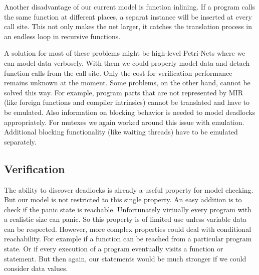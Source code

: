 Another disadvantage of our current model is function inlining.
If a program calls the same function at different places, a separat instance will be inserted at every call site.
This not only makes the net larger, it catches the translation process in an endless loop in recursive functions.

A solution for most of these problems might be high-level Petri-Nets where we can model data verbosely.
With them we could properly model data and detach function calls from the call site.
Only the cost for verification performance remains unknown at the moment.
Some problems, on the other hand, cannot be solved this way.
For example, program parts that are not represented by MIR (like foreign functions and compiler intrinsics) cannot be translated and have to be emulated.
Also information on blocking behavior is needed to model deadlocks appropriately.
For mutexes we again worked around this issue with emulation.
Additional blocking functionality (like waiting threads) have to be emulated separately.

\subsection{Verification}
The ability to discover deadlocks is already a useful property for model checking.
But our model is not restricted to this single property.
An easy addition is to check if the panic state is reachable.
Unfortunately virtually every program with a realistic size can panic.
So this property is of limited use unless variable data can be respected.
However, more complex properties could deal with conditional reachability.
For example if a function can be reached from a particular program state.
Or if every execution of a program eventually visits a function or statement.
But then again, our statements would be much stronger if we could consider data values.
